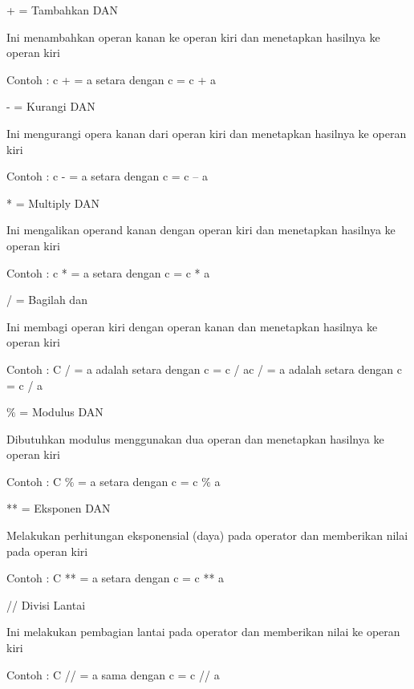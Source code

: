 + = Tambahkan DAN \par
\noindent 
Ini menambahkan operan kanan ke operan kiri dan menetapkan hasilnya ke operan kiri \par
\noindent 
Contoh : c + = a setara dengan c = c + a \par
\noindent 
\vspace{12pt}
\noindent 
- = Kurangi DAN \par
\noindent 
Ini mengurangi opera kanan dari operan kiri dan menetapkan hasilnya ke operan kiri \par
\noindent 
Contoh : c - = a setara dengan c = c – a \par
\noindent 
\vspace{12pt}
\noindent 
* = Multiply DAN \par
\noindent 
Ini mengalikan operand kanan dengan operan kiri dan menetapkan hasilnya ke operan kiri \par
\noindent 
Contoh : c * = a setara dengan c = c * a \par
\noindent 
\vspace{12pt}
\noindent 
/ = Bagilah dan \par
\noindent 
Ini membagi operan kiri dengan operan kanan dan menetapkan hasilnya ke operan kiri \par
\noindent 
Contoh : C / = a adalah setara dengan c = c / ac / = a adalah setara dengan c = c / a \par
\noindent 
\vspace{12pt}
\noindent 
 $  \%  $ = Modulus DAN \par
\noindent 
Dibutuhkan modulus menggunakan dua operan dan menetapkan hasilnya ke operan kiri \par
\noindent 
Contoh : C $  \%  $ = a setara dengan c = c $  \%  $ a \par
\noindent 
\vspace{12pt}
\noindent 
** = Eksponen DAN \par
\noindent 
Melakukan perhitungan eksponensial (daya) pada operator dan memberikan nilai pada operan kiri \par
\noindent 
Contoh : C ** = a setara dengan c = c ** a \par
\noindent 
\vspace{12pt}
\noindent 
// Divisi Lantai \par
\noindent 
Ini melakukan pembagian lantai pada operator dan memberikan nilai ke operan kiri \par
\noindent 
Contoh : C // = a sama dengan c = c // a \par
